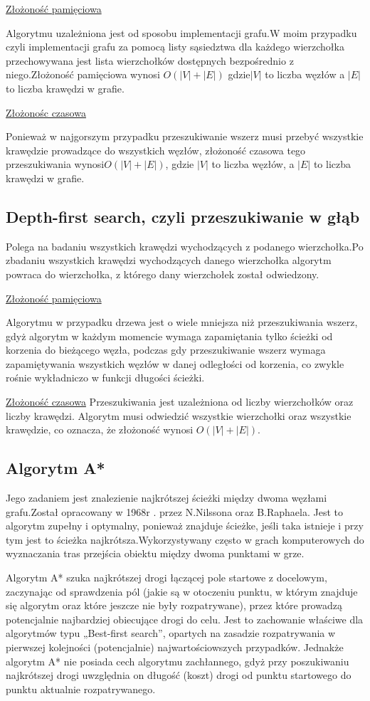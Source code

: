 \documentclass[11pt]{article}
\begin{document}
\underline{Złożoność pamięciowa}

 Algorytmu uzależniona jest od sposobu implementacji grafu.W moim przypadku czyli implementacji grafu za pomocą listy sąsiedztwa dla każdego wierzchołka przechowywana jest lista wierzchołków dostępnych bezpośrednio z niego.Złożoność pamięciowa wynosi $O(|V|+|E|)$ gdzie$|V|$ to liczba węzłów a $|E|$ to liczba krawędzi w grafie.
 
\underline{Złożonośc czasowa}

Ponieważ w najgorszym przypadku przeszukiwanie wszerz musi przebyć wszystkie krawędzie prowadzące do wszystkich węzłów, złożoność czasowa tego przeszukiwania wynosi$ O(|V| + |E|)$, gdzie $|V|$ to liczba węzłów, a $|E|$ to liczba krawędzi w grafie.

\subsection{Depth-first search, czyli przeszukiwanie w głąb}
Polega na badaniu wszystkich krawędzi wychodzących z podanego wierzchołka.Po zbadaniu wszystkich krawędzi wychodzących danego wierzchołka algorytm powraca do wierzchołka, z którego dany wierzchołek został odwiedzony.

\underline{Złożoność pamięciowa} 

Algorytmu w przypadku drzewa jest o wiele mniejsza niż przeszukiwania wszerz, gdyż algorytm w każdym momencie wymaga zapamiętania tylko ścieżki od korzenia do bieżącego węzła, podczas gdy przeszukiwanie wszerz wymaga zapamiętywania wszystkich węzłów w danej odległości od korzenia, co zwykle rośnie wykładniczo w funkcji długości ścieżki.

\underline{Złożoność czasowa} 
Przeszukiwania jest uzależniona od liczby wierzchołków oraz liczby krawędzi. Algorytm musi odwiedzić wszystkie wierzchołki oraz wszystkie krawędzie, co oznacza, że złożoność wynosi $O(|V|+|E|)$.
\newpage
\subsection{Algorytm A*}
 Jego zadaniem jest znalezienie najkrótszej ścieżki między dwoma węzłami grafu.Został opracowany w 1968r . przez N.Nilssona oraz B.Raphaela. Jest to algorytm zupełny i optymalny, ponieważ znajduje ścieżke, jeśli taka istnieje i przy tym jest to ścieżka najkrótsza.Wykorzystywany często w grach komputerowych do wyznaczania tras przejścia obiektu między dwoma punktami w grze.

Algorytm A* szuka najkrótszej drogi łączącej pole startowe z docelowym, zaczynając od sprawdzenia pól (jakie są w otoczeniu punktu, w którym znajduje się algorytm oraz które jeszcze nie były rozpatrywane), przez które prowadzą potencjalnie najbardziej obiecujące drogi do celu. Jest to zachowanie właściwe dla algorytmów typu „Best-first search”, opartych na zasadzie rozpatrywania w pierwszej kolejności (potencjalnie) najwartościowszych przypadków. Jednakże algorytm A* nie posiada cech algorytmu zachłannego, gdyż przy poszukiwaniu najkrótszej drogi uwzględnia on długość (koszt) drogi od punktu startowego do punktu aktualnie rozpatrywanego. 
\end{document}
